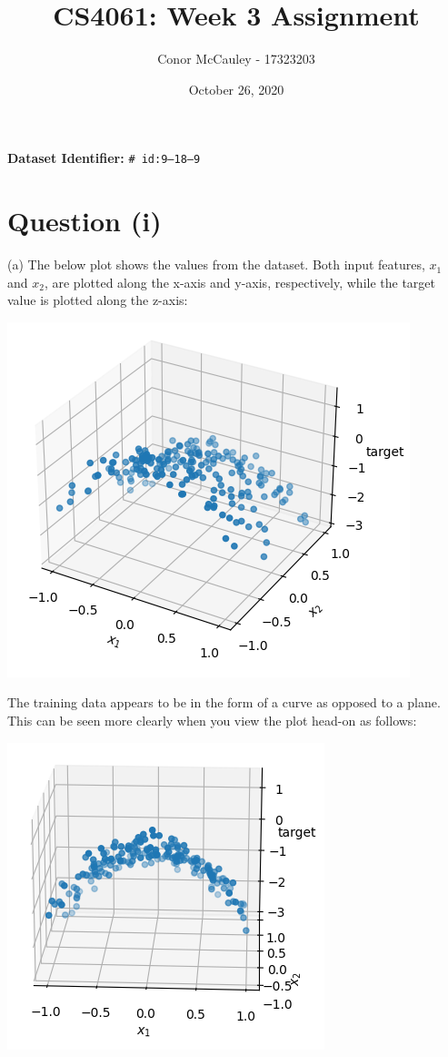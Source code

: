 \documentclass[12pt]{article}
\title{CS4061: Week 3 Assignment}
\author{Conor McCauley - 17323203}
\date{October 26, 2020}
\begin{document}
\maketitle

\noindent \textbf{Dataset Identifier:} \texttt{\# id:9--18--9}

\section*{Question (i)}

\noindent (a) The below plot shows the values from the dataset. Both input features, $x_1$ and $x_2$, are plotted along the x-axis and y-axis, respectively, while the target value is plotted along the z-axis:

\begin{center}
    \includegraphics[scale=0.55]{fig_1.png}
\end{center}

The training data appears to be in the form of a curve as opposed to a plane. This can be seen more clearly when you view the plot head-on as follows:

\begin{center}
    \includegraphics[scale=0.65]{fig_2.png}
\end{center}
\end{document}
